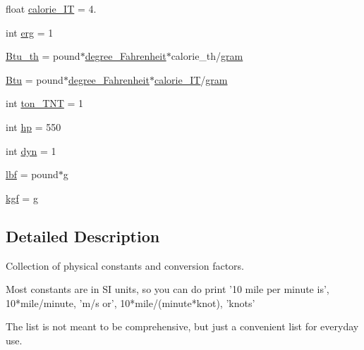 \begin{DoxyCompactItemize}
float \hyperlink{namespacescipy_1_1constants_1_1constants_a629bfa8e463f96b5779fa0e156f188fd}{calorie\+\_\+\+I\+T} = 4.
\item 
int \hyperlink{namespacescipy_1_1constants_1_1constants_af2515057359bf48dc425933e85ed1411}{erg} = 1
\item 
\hyperlink{namespacescipy_1_1constants_1_1constants_a30c4a0fb2ab61d884bb2e6fa8c0b98a8}{Btu\+\_\+th} = pound$\ast$\hyperlink{namespacescipy_1_1constants_1_1constants_a503977f7da4b98806eac1bc386f2f5bd}{degree\+\_\+\+Fahrenheit}$\ast$calorie\+\_\+th/\hyperlink{namespacescipy_1_1constants_1_1constants_af4a5b311bb012f3f1d3d37fa13ac3754}{gram}
\item 
\hyperlink{namespacescipy_1_1constants_1_1constants_a373d6a4dda3fc744b13c25470c305ba7}{Btu} = pound$\ast$\hyperlink{namespacescipy_1_1constants_1_1constants_a503977f7da4b98806eac1bc386f2f5bd}{degree\+\_\+\+Fahrenheit}$\ast$\hyperlink{namespacescipy_1_1constants_1_1constants_a629bfa8e463f96b5779fa0e156f188fd}{calorie\+\_\+\+I\+T}/\hyperlink{namespacescipy_1_1constants_1_1constants_af4a5b311bb012f3f1d3d37fa13ac3754}{gram}
\item 
int \hyperlink{namespacescipy_1_1constants_1_1constants_a49071e6ae3c763e63ff5560c51d31dfa}{ton\+\_\+\+T\+N\+T} = 1
\item 
int \hyperlink{namespacescipy_1_1constants_1_1constants_a0c3646c4fd7a9c2fb04edd3e027bc582}{hp} = 550
\item 
int \hyperlink{namespacescipy_1_1constants_1_1constants_a1073ac690225949e6a6e52c2b059fb8a}{dyn} = 1
\item 
\hyperlink{namespacescipy_1_1constants_1_1constants_a8767e3d2a0ca45b0e411c331f0498576}{lbf} = pound$\ast$\hyperlink{namespacescipy_1_1constants_1_1constants_a83effeb17733c44ab49399687fb4d21b}{g}
\item 
\hyperlink{namespacescipy_1_1constants_1_1constants_a546ec6979ecc9c8c1c25a762803e8b15}{kgf} = \hyperlink{namespacescipy_1_1constants_1_1constants_a83effeb17733c44ab49399687fb4d21b}{g}
\end{DoxyCompactItemize}


\subsection{Detailed Description}
\begin{DoxyVerb}Collection of physical constants and conversion factors.

Most constants are in SI units, so you can do
print '10 mile per minute is', 10*mile/minute, 'm/s or', 10*mile/(minute*knot), 'knots'

The list is not meant to be comprehensive, but just a convenient list for everyday use.
\end{DoxyVerb}
 

